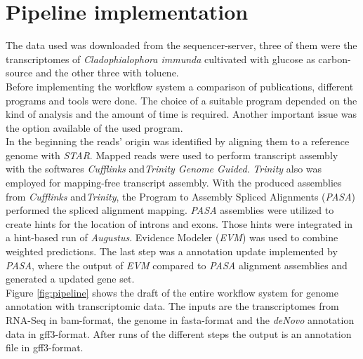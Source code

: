 \documentclass[12pt, a4paper]{report}
\begin{document}
\section{Pipeline implementation}
The data used was downloaded from the sequencer-server, three of them were the transcriptomes of \textit{Cladophialophora immunda} cultivated with glucose as carbon-source and the other three with toluene. \\
Before implementing the workflow system a comparison of publications, different programs and tools were done. The choice of a suitable program depended on the kind of analysis and the amount of time is required. Another important issue was the option available of the used program. \\
In the beginning the reads' origin was identified by aligning them to a reference genome with \textit{STAR}. Mapped reads were used to perform transcript assembly with the softwares \textit{Cufflinks} and\textit{Trinity Genome Guided}. \textit{Trinity} also was employed for mapping-free transcript assembly. With the produced assemblies from \textit{Cufflinks} and\textit{Trinity}, the Program to Assembly Spliced Alignments (\textit{PASA}) performed the spliced alignment mapping. \textit{PASA} assemblies were utilized to create hints for the location of introns and exons. Those hints were integrated in a hint-based run of \textit{Augustus}. Evidence Modeler (\textit{EVM}) was used to combine weighted predictions. The last step was a annotation update implemented by \textit{PASA}, where the output of \textit{EVM} compared to \textit{PASA} alignment assemblies and generated a updated gene set. \cite{Haas2011, Steijger2013, Linde2015} \\
Figure \ref{fig:pipeline} shows the draft of the entire workflow system for genome annotation with transcriptomic data. The inputs are the transcriptomes from RNA-Seq in bam-format, the genome in fasta-format and the \textit{deNovo} annotation data in gff3-format. After runs of the different steps the output is an annotation file in gff3-format.
\end{document}

